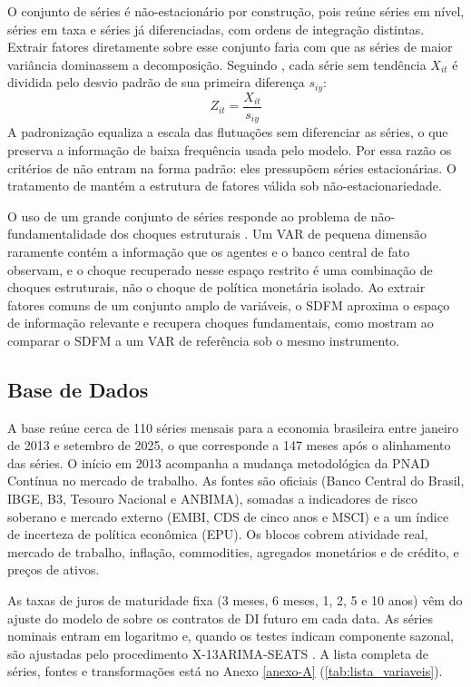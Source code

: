 \documentclass[preprint,authoryear,review,12pt]{elsarticle}
\begin{document}
O conjunto de séries é não-estacionário por construção, pois reúne séries em nível, séries em taxa e séries já diferenciadas, com ordens de integração distintas. Extrair fatores diretamente sobre esse conjunto faria com que as séries de maior variância dominassem a decomposição. Seguindo \cite{barigozzi2016non}, cada série sem tendência $X_{it}$ é dividida pelo desvio padrão de sua primeira diferença $s_{iy}$:
\begin{equation}
    Z_{it} = \frac{X_{it}}{s_{iy}}
\end{equation}
A padronização equaliza a escala das flutuações sem diferenciar as séries, o que preserva a informação de baixa frequência usada pelo modelo. Por essa razão os critérios de \cite{bai-ng} não entram na forma padrão: eles pressupõem séries estacionárias. O tratamento de \cite{barigozzi2016non} mantém a estrutura de fatores válida sob não-estacionariedade.

O uso de um grande conjunto de séries responde ao problema de não-fundamentalidade dos choques estruturais \cite{villaverde}. Um VAR de pequena dimensão raramente contém a informação que os agentes e o banco central de fato observam, e o choque recuperado nesse espaço restrito é uma combinação de choques estruturais, não o choque de política monetária isolado. Ao extrair fatores comuns de um conjunto amplo de variáveis, o SDFM aproxima o espaço de informação relevante e recupera choques fundamentais, como mostram \cite{alessi} ao comparar o SDFM a um VAR de referência sob o mesmo instrumento.

\subsection{Base de Dados}

A base reúne cerca de 110 séries mensais para a economia brasileira entre janeiro de 2013 e setembro de 2025, o que corresponde a 147 meses após o alinhamento das séries. O início em 2013 acompanha a mudança metodológica da PNAD Contínua no mercado de trabalho. As fontes são oficiais (Banco Central do Brasil, IBGE, B3, Tesouro Nacional e ANBIMA), somadas a indicadores de risco soberano e mercado externo (EMBI, CDS de cinco anos e MSCI) e a um índice de incerteza de política econômica (EPU). Os blocos cobrem atividade real, mercado de trabalho, inflação, commodities, agregados monetários e de crédito, e preços de ativos.

As taxas de juros de maturidade fixa (3 meses, 6 meses, 1, 2, 5 e 10 anos) vêm do ajuste do modelo de \cite{svensson1994estimating} sobre os contratos de DI futuro em cada data. As séries nominais entram em logaritmo e, quando os testes indicam componente sazonal, são ajustadas pelo procedimento X-13ARIMA-SEATS \cite{sax2018seasonal}. A lista completa de séries, fontes e transformações está no Anexo \ref{anexo-A} (\autoref{tab:lista_variaveis}).
\end{document}
